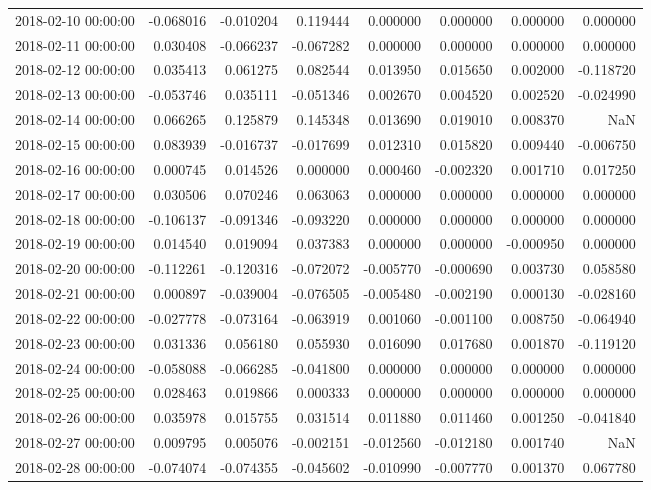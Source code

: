 \begin{tabular}{lrrrrrrr}
2018-02-10 00:00:00 & -0.068016 & -0.010204 & 0.119444 & 0.000000 & 0.000000 & 0.000000 & 0.000000 \\
2018-02-11 00:00:00 & 0.030408 & -0.066237 & -0.067282 & 0.000000 & 0.000000 & 0.000000 & 0.000000 \\
2018-02-12 00:00:00 & 0.035413 & 0.061275 & 0.082544 & 0.013950 & 0.015650 & 0.002000 & -0.118720 \\
2018-02-13 00:00:00 & -0.053746 & 0.035111 & -0.051346 & 0.002670 & 0.004520 & 0.002520 & -0.024990 \\
2018-02-14 00:00:00 & 0.066265 & 0.125879 & 0.145348 & 0.013690 & 0.019010 & 0.008370 & NaN \\
2018-02-15 00:00:00 & 0.083939 & -0.016737 & -0.017699 & 0.012310 & 0.015820 & 0.009440 & -0.006750 \\
2018-02-16 00:00:00 & 0.000745 & 0.014526 & 0.000000 & 0.000460 & -0.002320 & 0.001710 & 0.017250 \\
2018-02-17 00:00:00 & 0.030506 & 0.070246 & 0.063063 & 0.000000 & 0.000000 & 0.000000 & 0.000000 \\
2018-02-18 00:00:00 & -0.106137 & -0.091346 & -0.093220 & 0.000000 & 0.000000 & 0.000000 & 0.000000 \\
2018-02-19 00:00:00 & 0.014540 & 0.019094 & 0.037383 & 0.000000 & 0.000000 & -0.000950 & 0.000000 \\
2018-02-20 00:00:00 & -0.112261 & -0.120316 & -0.072072 & -0.005770 & -0.000690 & 0.003730 & 0.058580 \\
2018-02-21 00:00:00 & 0.000897 & -0.039004 & -0.076505 & -0.005480 & -0.002190 & 0.000130 & -0.028160 \\
2018-02-22 00:00:00 & -0.027778 & -0.073164 & -0.063919 & 0.001060 & -0.001100 & 0.008750 & -0.064940 \\
2018-02-23 00:00:00 & 0.031336 & 0.056180 & 0.055930 & 0.016090 & 0.017680 & 0.001870 & -0.119120 \\
2018-02-24 00:00:00 & -0.058088 & -0.066285 & -0.041800 & 0.000000 & 0.000000 & 0.000000 & 0.000000 \\
2018-02-25 00:00:00 & 0.028463 & 0.019866 & 0.000333 & 0.000000 & 0.000000 & 0.000000 & 0.000000 \\
2018-02-26 00:00:00 & 0.035978 & 0.015755 & 0.031514 & 0.011880 & 0.011460 & 0.001250 & -0.041840 \\
2018-02-27 00:00:00 & 0.009795 & 0.005076 & -0.002151 & -0.012560 & -0.012180 & 0.001740 & NaN \\
2018-02-28 00:00:00 & -0.074074 & -0.074355 & -0.045602 & -0.010990 & -0.007770 & 0.001370 & 0.067780 \\

\end{tabular}
